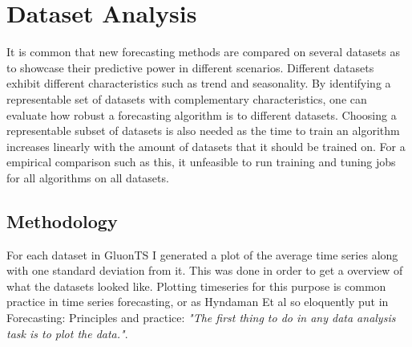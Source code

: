 
\section{Dataset Analysis}
It is common that new forecasting methods are compared on several datasets as to showcase their predictive power in different scenarios. Different datasets exhibit different characteristics such as trend and seasonality. By identifying a representable set of datasets with complementary characteristics, one can evaluate how robust a forecasting algorithm is to different datasets. Choosing a representable subset of datasets is also needed as the time to train an algorithm increases linearly with the amount of datasets that it should be trained on. For a empirical comparison such as this, it unfeasible to run training and tuning jobs for all algorithms on all datasets.

\subsection{Methodology}

For each dataset in GluonTS I generated a plot of the average time series along with one standard deviation from it. This was done in order to get a overview of what the datasets looked like. Plotting timeseries for this purpose is common practice in time series forecasting, or as Hyndaman Et al so eloquently put in Forecasting: Principles and practice: \textit{"The first thing to do in any data analysis task is to plot the data."}.\cite{hyndman_forecasting_3rd}

